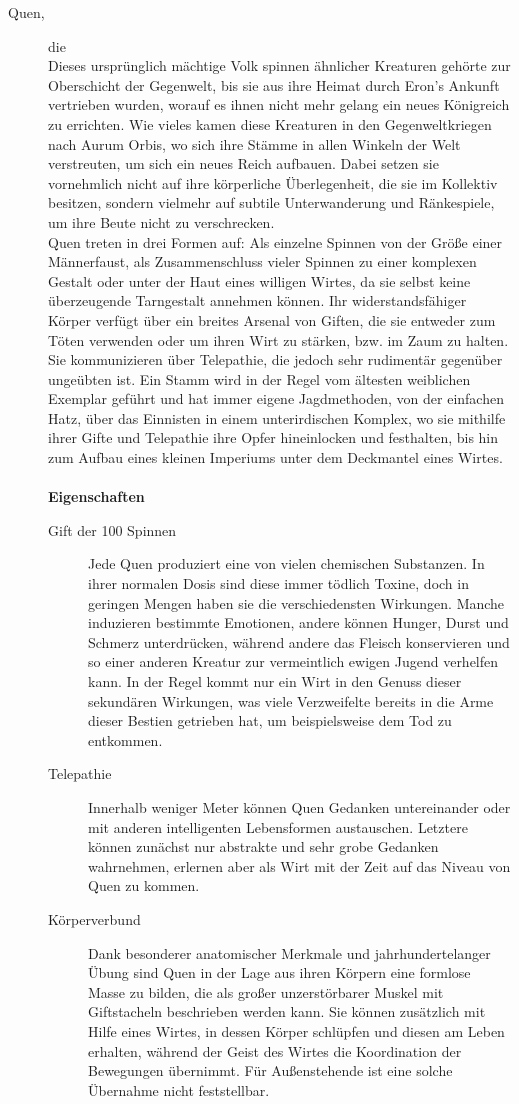 \documentclass[a4paper,12pt,oneside]{book}
\begin{document}
\begin{description}
\item[Quen,]die
\\Dieses ursprünglich mächtige Volk spinnen ähnlicher Kreaturen gehörte zur Oberschicht der Gegenwelt, bis sie aus ihre Heimat durch Eron's Ankunft vertrieben wurden, worauf es ihnen nicht mehr gelang ein neues Königreich zu errichten. Wie vieles kamen diese Kreaturen in den Gegenweltkriegen nach Aurum Orbis, wo sich ihre Stämme in allen Winkeln der Welt verstreuten, um sich ein neues Reich aufbauen. Dabei setzen sie vornehmlich nicht auf ihre körperliche Überlegenheit, die sie im Kollektiv besitzen, sondern vielmehr auf subtile Unterwanderung und Ränkespiele, um ihre Beute nicht zu verschrecken.
\\Quen treten in drei Formen auf: Als einzelne Spinnen von der Größe einer Männerfaust, als Zusammenschluss vieler Spinnen zu einer komplexen Gestalt oder unter der Haut eines willigen Wirtes, da sie selbst keine überzeugende Tarngestalt annehmen können. Ihr widerstandsfähiger Körper verfügt über ein breites Arsenal von Giften, die sie entweder zum Töten verwenden oder um ihren Wirt zu stärken, bzw. im Zaum zu halten. Sie kommunizieren über Telepathie, die jedoch sehr rudimentär gegenüber ungeübten ist. Ein Stamm wird in der Regel vom ältesten weiblichen Exemplar geführt und hat immer eigene Jagdmethoden, von der einfachen Hatz, über das Einnisten in einem unterirdischen Komplex, wo sie mithilfe ihrer Gifte und Telepathie ihre Opfer hineinlocken und festhalten, bis hin zum Aufbau eines kleinen Imperiums unter dem Deckmantel eines Wirtes.
\\\\\textbf{Eigenschaften}
\begin{description}
\item[Gift der 100 Spinnen]Jede Quen produziert eine von vielen chemischen Substanzen. In ihrer normalen Dosis sind diese immer tödlich Toxine, doch in geringen Mengen haben sie die verschiedensten Wirkungen. Manche induzieren bestimmte Emotionen, andere können Hunger, Durst und Schmerz unterdrücken, während andere das Fleisch konservieren und so einer anderen Kreatur zur vermeintlich ewigen Jugend verhelfen kann. In der Regel kommt nur ein Wirt in den Genuss dieser sekundären Wirkungen, was viele Verzweifelte bereits in die Arme dieser Bestien getrieben hat, um beispielsweise dem Tod zu entkommen.
\item[Telepathie]Innerhalb weniger Meter können Quen Gedanken untereinander oder mit anderen intelligenten Lebensformen austauschen. Letztere können zunächst nur abstrakte und sehr grobe Gedanken wahrnehmen, erlernen aber als Wirt mit der Zeit auf das Niveau von Quen zu kommen. 
\item[Körperverbund]Dank besonderer anatomischer Merkmale und jahrhundertelanger Übung sind Quen in der Lage aus ihren Körpern eine formlose Masse zu bilden, die als großer unzerstörbarer Muskel mit Giftstacheln beschrieben werden kann. Sie können zusätzlich mit Hilfe eines Wirtes, in dessen Körper schlüpfen und diesen am Leben erhalten, während der Geist des Wirtes die Koordination der Bewegungen übernimmt. Für Außenstehende ist eine solche Übernahme nicht feststellbar.
\end{description}


\end{description}
\end{document}
